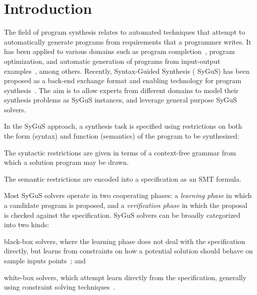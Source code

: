 \documentclass{llncs}
\newcommand{\sygus}{{\sffamily\fontsize{8.5}{10}\selectfont
    SyGuS}\xspace}
\begin{document}
\section{Introduction}
\label{sec:intro}

The field of program synthesis relates to automated techniques that
attempt to automatically generate programs from requirements that a
programmer writes.
It has been applied to various domains such as program
completion~\cite{solar-lezama-05}, program optimization, and automatic
generation of programs from input-output
examples~\cite{gulwani-popl-11}, among others.
Recently, Syntax-Guided Synthesis (\sygus) has been proposed as a
back-end exchange format and enabling technology for program
synthesis~\cite{udupa-sygus}.
The aim is to allow experts from different domains to model their
synthesis problems as \sygus instances, and leverage general purpose
\sygus solvers.

In the \sygus approach, a synthesis task is specified using
restrictions on both the form (syntax) and function (semantics) of the
program to be synthesized:
\begin{inparaenum}[(a)]
\item The syntactic restrictions are given in terms of a context-free
  grammar from which a solution program may be drawn.
\item The semantic restrictions are encoded into a specification as an
  SMT formula.
\end{inparaenum}
Most \sygus solvers operate in two cooperating phases: a {\em learning
  phase} in which a candidate program is proposed, and a {\em
verification phase} in which the proposal is checked against the
specification.
\sygus solvers can be broadly categorized into two kinds:
\begin{inparaenum}[(a)]
\item black-box solvers, where the learning phase does not deal with the
  specification directly, but learns from constraints on how a potential
  solution should behave on sample inputs
  points~\cite{udupa-transit,udupa-sygus,saha-15}; and
\item white-box solvers, which attempt learn directly from the
  specification, generally using constraint solving techniques~\cite{reynolds-15,alur-15}.
\end{inparaenum}
\end{document}
